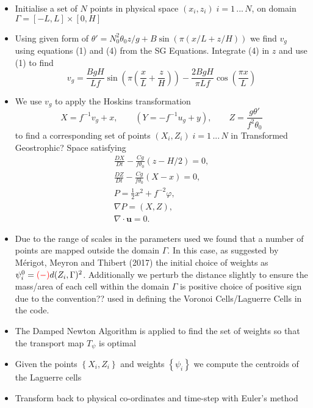 \documentclass[]{article}
\begin{document}
	\begin{itemize}
	\item Initialise a set of $N$ points in physical space $(x_i,z_i) \; i = 1\,...\,N$, on domain $\Gamma = [-L,L] \times [0,H]$
	\item Using given form of $\theta ' = N_0^2 \theta_0 z /g + B\sin(\pi(x/L +z/H))$ we find $v_g$ using equations (1) and (4) from the SG Equations. Integrate (4) in $z$ and use (1) to find 
	\begin{equation}
		v_g = \frac{BgH}{Lf}\sin\left( \pi \left( \frac{x}{L} + \frac{z}{H}\right)\right) - \frac{2BgH}{\pi Lf}\cos\left(\frac{\pi x}{L}\right)
	\end{equation}
	\item We use $v_g$ to apply the Hoskins transformation
	\begin{equation*}
	X = f^{-1}v_g + x,\qquad \left(Y = -f^{-1}u_g + y\right), \qquad Z = \frac{g\theta'}{f^2\theta_0}
	\end{equation*}
	to find a corresponding set of points $(X_i,Z_i) \; i = 1 \,...\,N$ in Transformed \color{red} Geostrophic?\color{black} Space satisfying
	\begin{align*}
	\frac{DX}{Dt} -\frac{Cg}{f\theta _0}\left(z-H/2\right) = 0,\\
	\frac{DZ}{Dt} - \frac{Cg}{f\theta _0}\left(X-x\right) = 0,\\
	P = \frac{1}{2}x^2 + f^{-2}\varphi,\\
	\nabla P = \left( X, Z\right),\\
	\nabla \cdot \bm{u} = 0.
	\end{align*}
	\item Due to the range of scales in the parameters used we found that a number of points are mapped outside the domain $\Gamma$. In this case, as suggested by M\'{e}rigot, Meyron and Thibert (2017) the initial choice of weights as $\psi_i^0 = \color{red}(-)\color{black}d(Z_i,\Gamma)^2$. Additionally we perturb the distance slightly to ensure the mass/area of each cell within the domain $\Gamma$ is positive \color{red} choice of positive sign due to the convention?? used in defining the Voronoi Cells/Laguerre Cells in the code.\color{black} 
	\item The Damped Newton Algorithm is applied to find the set of weights so that the transport map $T_\psi$ is optimal 
	\item Given the points $\left\lbrace X_i,Z_i\right\rbrace $ and weights $\left\lbrace \psi_i \right\rbrace $ we compute the centroids of the Laguerre cells
	\item Transform back to physical co-ordinates and time-step with Euler's method
	 \end{itemize}
\end{document}
